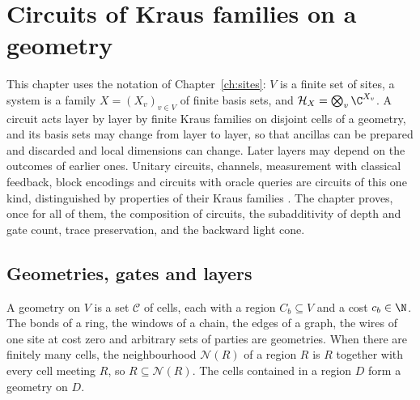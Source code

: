 \chapter{Circuits of Kraus families on a geometry}
\label{ch:circuits}

This chapter uses the notation of Chapter~\ref{ch:sites}: $V$ is a finite set of
sites, a system is a family $X=(X_v)_{v\in V}$ of finite basis sets, and
$\mathcal H_X=\bigotimes_v\C^{X_v}$. A circuit acts layer by layer by finite Kraus
families on disjoint cells of a geometry, and its basis sets may change from layer
to layer, so that ancillas can be prepared and discarded and local dimensions can
change. Later layers may depend on the outcomes of earlier ones. Unitary circuits,
channels, measurement with classical feedback, block encodings and circuits with
oracle queries are circuits of this one kind, distinguished by properties of their
Kraus families \cite{NielsenChuang2010}. The chapter proves, once for all of them,
the composition of circuits, the subadditivity of depth and gate count, trace
preservation, and the backward light cone.

\section{Geometries, gates and layers}
\label{sec:circuits_layers}

\begin{definition}[Geometry]
    \label{def:circuits_geometry}
    \leanok
    A geometry on $V$ is a set $\mathcal C$ of cells, each with a region
    $C_b\subseteq V$ and a cost $c_b\in\N$. The bonds of a ring, the windows of a
    chain, the edges of a graph, the wires of one site at cost zero and arbitrary
    sets of parties are geometries. When there are finitely many cells, the
    neighbourhood $\mathcal N(R)$ of a region $R$ is $R$ together with every cell
    meeting $R$, so $R\subseteq\mathcal N(R)$.
    The cells contained in a region $D$ form a geometry on $D$.
\end{definition}

